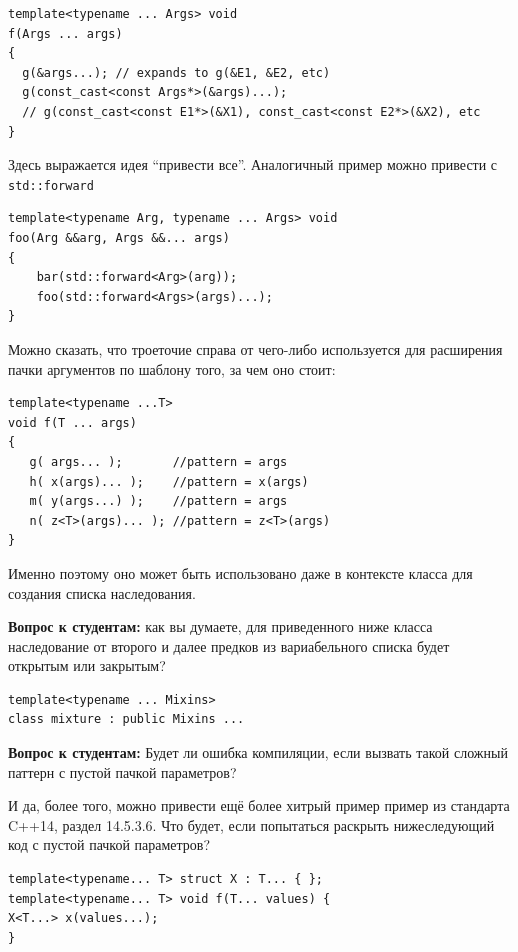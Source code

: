 \documentclass[a4paper,12pt,oneside]{article}
\newif\ifanswers
\begin{document}
\begin{lstlisting}
template<typename ... Args> void 
f(Args ... args)
{
  g(&args...); // expands to g(&E1, &E2, etc)
  g(const_cast<const Args*>(&args)...);
  // g(const_cast<const E1*>(&X1), const_cast<const E2*>(&X2), etc
}
\end{lstlisting}

Здесь выражается идея ``привести все''. Аналогичный пример можно привести с \lstinline!std::forward!

\begin{lstlisting}
template<typename Arg, typename ... Args> void 
foo(Arg &&arg, Args &&... args)
{
    bar(std::forward<Arg>(arg));
    foo(std::forward<Args>(args)...);
}
\end{lstlisting}

Можно сказать, что троеточие справа от чего-либо используется для расширения пачки аргументов по шаблону того, за чем оно стоит:

\begin{lstlisting}
template<typename ...T>
void f(T ... args) 
{
   g( args... );       //pattern = args
   h( x(args)... );    //pattern = x(args)
   m( y(args...) );    //pattern = args
   n( z<T>(args)... ); //pattern = z<T>(args)
}
\end{lstlisting}

Именно поэтому оно может быть использовано даже в контексте класса для создания списка наследования.

\textbf{Вопрос к студентам:} как вы думаете, для приведенного ниже класса наследование от второго и далее предков из вариабельного списка будет открытым или закрытым?

\begin{lstlisting}
template<typename ... Mixins>
class mixture : public Mixins ...  
\end{lstlisting}

\ifanswers
Правильный ответ: открытым, поскольку \lstinline!pattern = public Mixins!
\fi

\textbf{Вопрос к студентам:} Будет ли ошибка компиляции, если вызвать такой сложный паттерн с пустой пачкой параметров?

\ifanswers
Правильный ответ: все будет хорошо.
\fi

И да, более того, можно привести ещё более хитрый пример пример из стандарта C++14, раздел 14.5.3.6. Что будет, если попытаться раскрыть нижеследующий код с пустой пачкой параметров?

\begin{lstlisting}
template<typename... T> struct X : T... { };
template<typename... T> void f(T... values) {
X<T...> x(values...);
}
\end{lstlisting}
\end{document}
